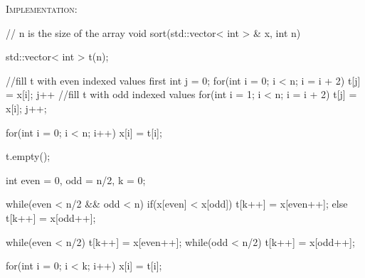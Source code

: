 \textsc{Implementation}:
\begin{answercode} 
// n is the size of the array
void sort(std::vector< int > & x, int n)
{
    std::vector< int > t(n);

    //fill t with even indexed values first
    int j = 0;
    for(int i = 0; i < n; i = i + 2)
    {
      t[j] = x[i];
      j++
    }
    //fill t with odd indexed values
    for(int i = 1; i < n; i = i + 2)
    {
      t[j] = x[i];
      j++;
    }

    for(int i = 0; i < n; i++)
    {
      x[i] = t[i];
    }

    t.empty();

    int even = 0, odd = n/2, k = 0;
    
    while(even < n/2 && odd < n)
    {
      if(x[even] < x[odd])
        t[k++] = x[even++];
      else
        t[k++] = x[odd++];
    }

    while(even < n/2)
       t[k++] = x[even++];
    while(odd < n/2)
       t[k++] = x[odd++];

    for(int i = 0; i < k; i++)
    {
      x[i] = t[i];
    }
} 
\end{answercode}

\newpage


